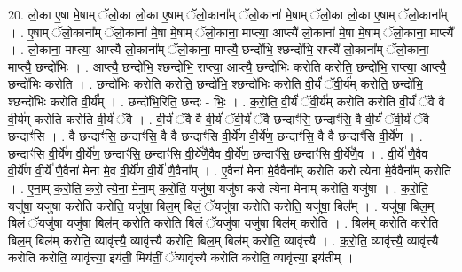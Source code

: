 \documentclass[17pt]{extarticle}
\begin{document}
20. लो॒का ए॒षा मे॒षाम् ॅलो॒का लो॒का ए॒षाम् ॅलो॒काना᳚म् ॅलो॒काना॑ मे॒षाम् ॅलो॒का लो॒का ए॒षाम् ॅलो॒काना᳚म् । . ए॒षाम् ॅलो॒काना᳚म् ॅलो॒काना॑ मे॒षा मे॒षाम् ॅलो॒काना॒ माप्त्या॒ आप्त्यै॑ लो॒काना॑ मे॒षा मे॒षाम् ॅलो॒काना॒ माप्त्यै᳚ । . लो॒काना॒ माप्त्या॒ आप्त्यै॑ लो॒काना᳚म् ॅलो॒काना॒ माप्त्यै॒ छन्दो॑भि॒ श्छन्दो॑भि॒ राप्त्यै॑ लो॒काना᳚म् ॅलो॒काना॒ माप्त्यै॒ छन्दो॑भिः । . आप्त्यै॒ छन्दो॑भि॒ श्छन्दो॑भि॒ राप्त्या॒ आप्त्यै॒ छन्दो॑भिः करोति करोति॒ छन्दो॑भि॒ राप्त्या॒ आप्त्यै॒ छन्दो॑भिः करोति । . छन्दो॑भिः करोति करोति॒ छन्दो॑भि॒ श्छन्दो॑भिः करोति वी॒र्यं॑ ॅवी॒र्य॑म् करोति॒ छन्दो॑भि॒ श्छन्दो॑भिः करोति वी॒र्य᳚म् । . छन्दो॑भि॒रिति॒ छन्दः॑ - भिः॒ । . क॒रो॒ति॒ वी॒र्यं॑ ॅवी॒र्य॑म् करोति करोति वी॒र्यं॑ ॅवै वै वी॒र्य॑म् करोति करोति वी॒र्यं॑ ॅवै । . वी॒र्यं॑ ॅवै वै वी॒र्यं॑ ॅवी॒र्यं॑ ॅवै छन्दाꣳ॑सि॒ छन्दाꣳ॑सि॒ वै वी॒र्यं॑ ॅवी॒र्यं॑ ॅवै छन्दाꣳ॑सि । . वै छन्दाꣳ॑सि॒ छन्दाꣳ॑सि॒ वै वै छन्दाꣳ॑सि वी॒र्ये॑ण वी॒र्ये॑ण॒ छन्दाꣳ॑सि॒ वै वै छन्दाꣳ॑सि वी॒र्ये॑ण । . छन्दाꣳ॑सि वी॒र्ये॑ण वी॒र्ये॑ण॒ छन्दाꣳ॑सि॒ छन्दाꣳ॑सि वी॒र्ये॑णै॒वैव वी॒र्ये॑ण॒ छन्दाꣳ॑सि॒ छन्दाꣳ॑सि वी॒र्ये॑णै॒व । . वी॒र्ये॑ णै॒वैव वी॒र्ये॑ण वी॒र्ये॑ णै॒वैना॑ मेना मे॒व वी॒र्ये॑ण वी॒र्ये॑ णै॒वैना᳚म् । . ए॒वैना॑ मेना मे॒वैवैना᳚म् करोति करो त्येना मे॒वैवैना᳚म् करोति । . ए॒ना॒म् क॒रो॒ति॒ क॒रो॒ त्ये॒ना॒ मे॒ना॒म् क॒रो॒ति॒ यजु॑षा॒ यजु॑षा करो त्येना मेनाम् करोति॒ यजु॑षा । . क॒रो॒ति॒ यजु॑षा॒ यजु॑षा करोति करोति॒ यजु॑षा॒ बिल॒म् बिलं॒ ॅयजु॑षा करोति करोति॒ यजु॑षा॒ बिल᳚म् । . यजु॑षा॒ बिल॒म् बिलं॒ ॅयजु॑षा॒ यजु॑षा॒ बिल॑म् करोति करोति॒ बिलं॒ ॅयजु॑षा॒ यजु॑षा॒ बिल॑म् करोति । . बिल॑म् करोति करोति॒ बिल॒म् बिल॑म् करोति॒ व्यावृ॑त्त्यै॒ व्यावृ॑त्त्यै करोति॒ बिल॒म् बिल॑म् करोति॒ व्यावृ॑त्त्यै । . क॒रो॒ति॒ व्यावृ॑त्त्यै॒ व्यावृ॑त्त्यै करोति करोति॒ व्यावृ॑त्त्या॒ इय॑ती॒ मिय॑तीं॒ ॅव्यावृ॑त्त्यै करोति करोति॒ व्यावृ॑त्त्या॒ इय॑तीम् । \newline
\end{document}

